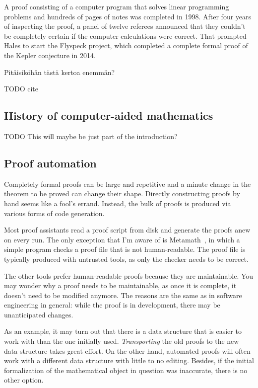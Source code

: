 \documentclass[english, 12pt, a4paper, sci, a-1b, online]{aaltothesis}
\begin{document}
A proof consisting of a computer program that solves linear programming problems and hundreds of pages of notes was completed in 1998. After four years of inspecting the proof, a panel of twelve referees announced that they couldn't be completely certain if the computer calculations were correct. That prompted Hales to start the Flyspeck project, which completed a complete formal proof of the Kepler conjecture in 2014.

Pitäisiköhän tästä kertoa enemmän?

TODO cite

\subsection{History of computer-aided mathematics}

TODO This will maybe be just part of the introduction?

\subsection{Proof automation}

Completely formal proofs can be large and repetitive and a minute change in the theorem to be proved can change their shape. Directly constructing proofs by hand seems like a fool's errand. Instead, the bulk of proofs is produced via various forms of code generation.

Most proof assistants read a proof script from disk and generate the proofs anew on every run. The only exception that I'm aware of is Metamath~\cite{MMZero}, in which a simple program checks a proof file that is not human-readable. The proof file is typically produced with untrusted tools, as only the checker needs to be correct.

The other tools prefer human-readable proofs because they are maintainable. You may wonder why a proof needs to be maintainable, as once it is complete, it doesn't need to be modified anymore. The reasons are the same as in software engineering in general: while the proof is in development, there may be unanticipated changes.

As an example, it may turn out that there is a data structure that is easier to work with than the one initially used. \emph{Transporting} the old proofs to the new data structure takes great effort. On the other hand, automated proofs will often work with a different data structure with little to no editing. Besides, if the initial formalization of the mathematical object in question was inaccurate, there is no other option.
\end{document}
